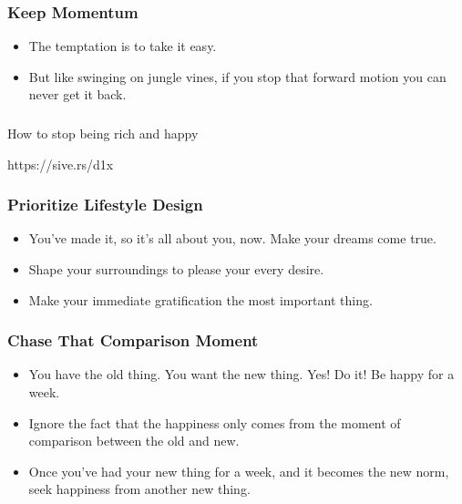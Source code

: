 \begin{frame}[fragile]\frametitle{Keep Momentum}

\begin{itemize}
\item The temptation is to take it easy.
\item But like swinging on jungle vines, if you stop that forward motion you can never get it back.
\end{itemize}

\end{frame}

\begin{frame}[fragile]\frametitle{}
\begin{center}
{\Large How to stop being rich and happy}
\end{center}

{\tiny https://sive.rs/d1x}

\end{frame}

\begin{frame}[fragile]\frametitle{Prioritize Lifestyle Design}

\begin{itemize}
\item You’ve made it, so it’s all about you, now. Make your dreams come true.
\item Shape your surroundings to please your every desire.
\item Make your immediate gratification the most important thing.
\end{itemize}

\end{frame}

\begin{frame}[fragile]\frametitle{Chase That Comparison Moment}

\begin{itemize}
\item You have the old thing. You want the new thing. Yes! Do it! Be happy for a week.
\item Ignore the fact that the happiness only comes from the moment of comparison between the old and new.
\item Once you’ve had your new thing for a week, and it becomes the new norm, seek happiness from another new thing.
\end{itemize}

\end{frame}

